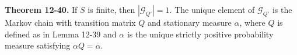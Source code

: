 \textbf{Theorem 12-40.} If $S$ is finite, then $|\mathcal{G}_{Q'}| = 1$. The unique element of $\mathcal{G}_{Q'}$ is the Markov chain with transition matrix $Q$ and stationary measure $\alpha$, where $Q$ is defined as in Lemma 12-39 and $\alpha$ is the unique strictly positive probability measure satisfying $\alpha Q = \alpha$.
